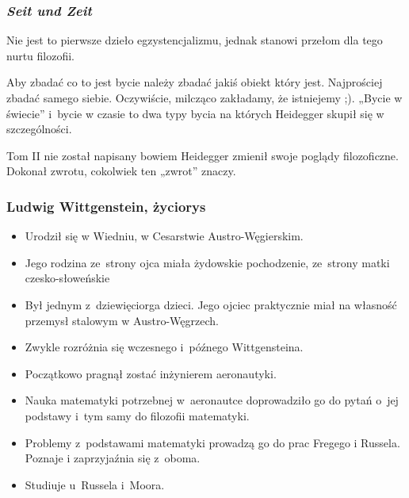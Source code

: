 \documentclass[10pt,t]{beamer}
\begin{document}
\begin{frame}
  \frametitle{\textit{Seit und Zeit}}


  Nie jest to pierwsze dzieło egzystencjalizmu, jednak stanowi przełom
  dla tego nurtu filozofii.

  Aby zbadać co to jest bycie należy zbadać jakiś obiekt
  który jest. Najprościej zbadać samego siebie. Oczywiście, milcząco
  zakładamy, że istniejemy ;). „Bycie w świecie” i~bycie w czasie to dwa
  typy bycia na których Heidegger skupił się w szczególności.

  Tom II nie został napisany bowiem Heidegger zmienił swoje
  poglądy filozoficzne. Dokonał zwrotu, cokolwiek ten „zwrot” znaczy.

\end{frame}





\begin{frame}
  \frametitle{Ludwig Wittgenstein, życiorys}


  \begin{itemize}

  \item Urodził się w Wiedniu, w Cesarstwie Austro-Węgierskim.

  \item Jego rodzina ze~strony ojca miała żydowskie pochodzenie,
    ze~strony matki czesko-słoweńskie

  \item Był jednym z~dziewięciorga dzieci. Jego ojciec praktycznie
    miał na własność przemysł stalowym w Austro-Węgrzech.

  \item Zwykle rozróżnia się wczesnego i~późnego Wittgensteina.

  \item Początkowo pragnął zostać inżynierem aeronautyki.

  \item Nauka matematyki potrzebnej w~aeronautce doprowadziło go do pytań
    o~jej podstawy i~tym samy do filozofii matematyki.

  \item Problemy z~podstawami matematyki prowadzą go do prac
    Fregego i Russela. Poznaje i zaprzyjaźnia się z~oboma.

  \item Studiuje u~Russela i~Moora.

  \end{itemize}

\end{frame}
\end{document}
